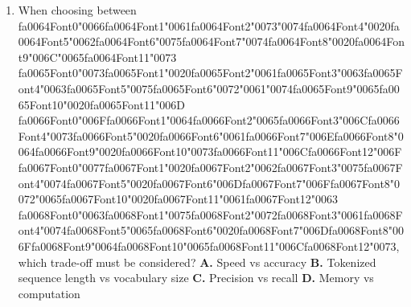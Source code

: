 \documentclass[11pt]{article}
\begin{document}
\begin{enumerate}[leftmargin=*]
  \item When choosing between {\csname fa0064Font0\endcsname\char"0066}{\csname fa0064Font1\endcsname\char"0061}{\csname fa0064Font2\endcsname\char"0073}{\char"0074}{\csname fa0064Font4\endcsname\char"0020}{\csname fa0064Font5\endcsname\char"0062}{\csname fa0064Font6\endcsname\char"0075}{\csname fa0064Font7\endcsname\char"0074}{\csname fa0064Font8\endcsname\char"0020}{\csname fa0064Font9\endcsname\char"006C}{\char"0065}{\csname fa0064Font11\endcsname\char"0073} {\csname fa0065Font0\endcsname\char"0073}{\csname fa0065Font1\endcsname\char"0020}{\csname fa0065Font2\endcsname\char"0061}{\csname fa0065Font3\endcsname\char"0063}{\csname fa0065Font4\endcsname\char"0063}{\csname fa0065Font5\endcsname\char"0075}{\csname fa0065Font6\endcsname\char"0072}{\char"0061}{\char"0074}{\csname fa0065Font9\endcsname\char"0065}{\csname fa0065Font10\endcsname\char"0020}{\csname fa0065Font11\endcsname\char"006D} {\csname fa0066Font0\endcsname\char"006F}{\csname fa0066Font1\endcsname\char"0064}{\csname fa0066Font2\endcsname\char"0065}{\csname fa0066Font3\endcsname\char"006C}{\csname fa0066Font4\endcsname\char"0073}{\csname fa0066Font5\endcsname\char"0020}{\csname fa0066Font6\endcsname\char"0061}{\csname fa0066Font7\endcsname\char"006E}{\csname fa0066Font8\endcsname\char"0064}{\csname fa0066Font9\endcsname\char"0020}{\csname fa0066Font10\endcsname\char"0073}{\csname fa0066Font11\endcsname\char"006C}{\csname fa0066Font12\endcsname\char"006F} {\csname fa0067Font0\endcsname\char"0077}{\csname fa0067Font1\endcsname\char"0020}{\csname fa0067Font2\endcsname\char"0062}{\csname fa0067Font3\endcsname\char"0075}{\csname fa0067Font4\endcsname\char"0074}{\csname fa0067Font5\endcsname\char"0020}{\csname fa0067Font6\endcsname\char"006D}{\csname fa0067Font7\endcsname\char"006F}{\csname fa0067Font8\endcsname\char"0072}{\char"0065}{\csname fa0067Font10\endcsname\char"0020}{\csname fa0067Font11\endcsname\char"0061}{\csname fa0067Font12\endcsname\char"0063} {\csname fa0068Font0\endcsname\char"0063}{\csname fa0068Font1\endcsname\char"0075}{\csname fa0068Font2\endcsname\char"0072}{\csname fa0068Font3\endcsname\char"0061}{\csname fa0068Font4\endcsname\char"0074}{\csname fa0068Font5\endcsname\char"0065}{\csname fa0068Font6\endcsname\char"0020}{\csname fa0068Font7\endcsname\char"006D}{\csname fa0068Font8\endcsname\char"006F}{\csname fa0068Font9\endcsname\char"0064}{\csname fa0068Font10\endcsname\char"0065}{\csname fa0068Font11\endcsname\char"006C}{\csname fa0068Font12\endcsname\char"0073}, which trade-off must be considered?
    \textbf{A.} Speed vs accuracy
    \textbf{B.} Tokenized sequence length vs vocabulary size
    \textbf{C.} Precision vs recall
    \textbf{D.} Memory vs computation

\end{enumerate}
\end{document}
